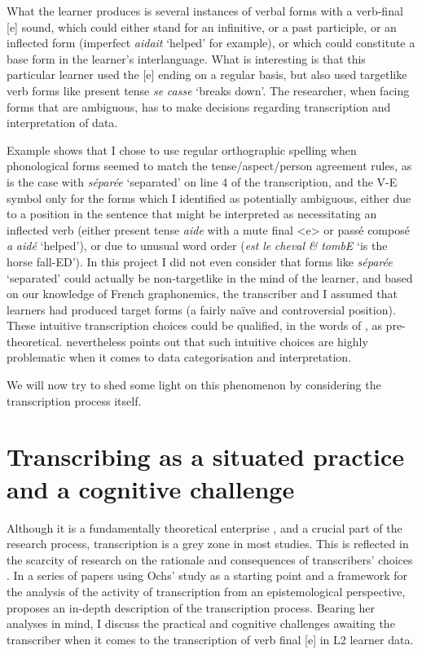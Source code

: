 \documentclass[output=paper,colorlinks,citecolor=brown,modfonts,nonflat]{../langscibook}
\begin{document}
What the learner produces is several instances of verbal forms with a verb-final [e] sound, which could either stand for an infinitive, or a past participle, or an inflected form (imperfect \textit{aidait} ‘helped’ for example), or which could constitute a base form in the learner’s interlanguage. What is interesting is that this particular learner used the [e] ending on a regular basis, but also used targetlike verb forms like present tense \textit{se} \textit{casse} ‘breaks down’. The researcher, when facing forms that are ambiguous, has to make decisions regarding transcription and interpretation of data. 

Example  shows that I chose to use regular orthographic spelling when phonological forms seemed to match the tense/aspect/person agreement rules, as is the case with \textit{séparée} ‘separated’ on line 4 of the transcription, and the V-E symbol only for the forms which I identified as potentially ambiguous, either due to a position in the sentence that might be interpreted as necessitating an inflected verb (either present tense \textit{aide} with a mute final <e> or passé composé \textit{a} \textit{aidé} ‘helped’), or due to unusual word order (\textit{est} \textit{le} \textit{cheval} \textit{\&} \textit{tombE} ‘is the horse fall-ED’). In this project I did not even consider that forms like \textit{séparée} ‘separated’ could actually be non-targetlike in the mind of the learner, and based on our knowledge of French graphonemics, the transcriber and I assumed that learners had produced target forms (a fairly naïve and controversial position). These intuitive transcription choices could be qualified, in the words of \citet{Ortega2014trying}, as pre-theoretical. \citet[3]{Mondada2000} nevertheless points out that such intuitive choices are highly problematic when it comes to data categorisation and interpretation.

We will now try to shed some light on this phenomenon by considering the transcription process itself.

\section{\textbf{Transcribing as a situated practice and a cognitive challenge}}%

Although it is a fundamentally theoretical enterprise \citep{Ochs1979}, and a crucial part of the research process, transcription is a grey zone in most studies. This is reflected in the scarcity of research on the rationale and consequences of transcribers’ choices \citep[46]{Mondada2002}. In a series of papers using Ochs’ study as a starting point and a framework for the analysis of the activity of transcription from an epistemological perspective, \citet{Mondada2000,Mondada2002,Mondada2007} proposes an in-depth description of the transcription process. Bearing her analyses in mind, I discuss the practical and cognitive challenges awaiting the transcriber when it comes to the transcription of verb final [e] in L2 learner data.
\end{document}
